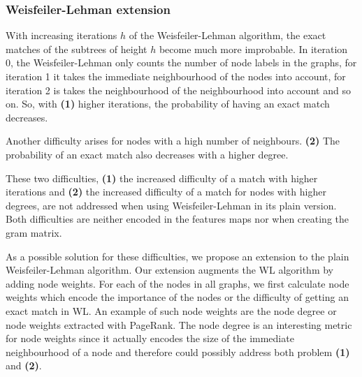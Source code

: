 

\subsubsection{Weisfeiler-Lehman extension}
With increasing iterations $h$ of the Weisfeiler-Lehman algorithm, the exact matches of the subtrees of height $h$ become much more improbable.
In iteration 0, the Weisfeiler-Lehman only counts the number of node labels in the graphs, for iteration 1 it takes the immediate neighbourhood of the nodes into account, for iteration 2 is takes the neighbourhood of the neighbourhood into account and so on.
So, with \textbf{(1)} higher iterations, the probability of having an exact match decreases.

Another difficulty arises for nodes with a high number of neighbours. \textbf{(2)} The probability of an exact match also decreases with a higher degree.

These two difficulties, \textbf{(1)} the increased difficulty of a match with higher iterations and \textbf{(2)} the increased difficulty of a match for nodes with higher degrees, are not addressed when using Weisfeiler-Lehman in its plain version. Both difficulties are neither encoded in the features maps nor when creating the gram matrix.

As a possible solution for these difficulties, we propose an extension to the plain Weisfeiler-Lehman algorithm.
Our extension augments the WL algorithm by adding node weights.
For each of the nodes in all graphs, we first calculate node weights which encode the importance of the nodes or the difficulty of getting an exact match in WL.
An example of such node weights are the node degree or node weights extracted with PageRank.
The node degree is an interesting metric for node weights since it actually encodes the size of the immediate neighbourhood of a node and therefore could possibly address both problem \textbf{(1)} and \textbf{(2)}.


